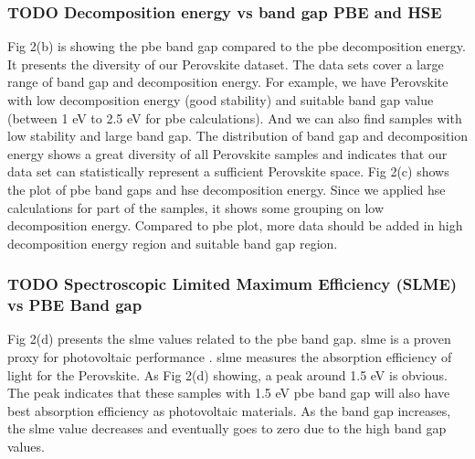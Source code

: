 \documentclass[twoside, twocolumn, 9pt, draft]{article}
\begin{document}
\subsubsection*{{\bfseries\sffamily TODO} Decomposition energy vs band gap PBE and HSE}
\label{sec:org539c9d9}
Fig 2(b) is showing the \acrshort{pbe} band gap compared to the
\acrshort{pbe} decomposition energy. It presents the diversity
of our Perovskite dataset. The data sets cover a large range of band
gap and decomposition energy. For example, we have Perovskite with low
decomposition energy (good stability) and suitable band gap value
(between 1 eV to 2.5 eV for \acrshort{pbe} calculations). And
we can also find samples with low stability and large band gap. The
distribution of band gap and decomposition energy shows a great
diversity of all Perovskite samples and indicates that our data set
can statistically represent a sufficient Perovskite space. Fig 2(c)
shows the plot of \acrshort{pbe} band gaps and
\acrshort{hse} decomposition energy. Since we applied
\acrshort{hse} calculations for part of the samples, it shows
some grouping on low decomposition energy. Compared to
\acrshort{pbe} plot, more data should be added in high
decomposition energy region and suitable band gap region.

\subsubsection*{{\bfseries\sffamily TODO} Spectroscopic Limited Maximum Efficiency (SLME) vs PBE Band gap}
\label{sec:org9dbfbb1}
Fig 2(d) presents the \gls{slme} values related to the
\acrshort{pbe} band gap. \gls{slme} is a proven proxy
for photovoltaic performance
\cite{yu-2012-ident-poten}. \gls{slme} measures the
absorption efficiency of light for the Perovskite. As Fig 2(d)
showing, a peak around 1.5 eV is obvious. The peak indicates that
these samples with 1.5 eV \acrshort{pbe} band gap will also
have best absorption efficiency as photovoltaic materials. As the band
gap increases, the \gls{slme} value decreases and eventually
goes to zero due to the high band gap values.
\end{document}
